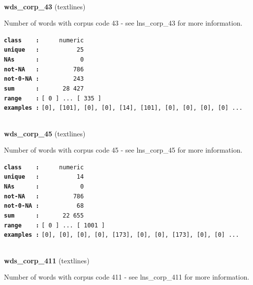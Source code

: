 \documentclass[]{article}
\begin{document}
~

\textbf{wds\_corp\_43} (textlines)

Number of words with corpus code 43 - see lns\_corp\_43 for more
information.

\textbf{\texttt{class\ \ \ \ :}} \texttt{~~~~~numeric}\\
\textbf{\texttt{unique\ \ \ :}} \texttt{~~~~~~~~~~25}\\
\textbf{\texttt{NAs\ \ \ \ \ \ :}} \texttt{~~~~~~~~~~~0}\\
\textbf{\texttt{not-NA\ \ \ :}} \texttt{~~~~~~~~~786}\\
\textbf{\texttt{not-0-NA\ :}} \texttt{~~~~~~~~~243}\\
\textbf{\texttt{sum\ \ \ \ \ \ :}} \texttt{~~~~~~28~427}\\
\textbf{\texttt{range\ \ \ \ :}}
\texttt{{[}\ 0\ {]}\ ...\ {[}\ 335\ {]}}\\
\textbf{\texttt{examples\ :}}
\texttt{{[}0{]},\ {[}101{]},\ {[}0{]},\ {[}0{]},\ {[}14{]},\ {[}101{]},\ {[}0{]},\ {[}0{]},\ {[}0{]},\ {[}0{]}\ ...}\\

~

\textbf{wds\_corp\_45} (textlines)

Number of words with corpus code 45 - see lns\_corp\_45 for more
information.

\textbf{\texttt{class\ \ \ \ :}} \texttt{~~~~~numeric}\\
\textbf{\texttt{unique\ \ \ :}} \texttt{~~~~~~~~~~14}\\
\textbf{\texttt{NAs\ \ \ \ \ \ :}} \texttt{~~~~~~~~~~~0}\\
\textbf{\texttt{not-NA\ \ \ :}} \texttt{~~~~~~~~~786}\\
\textbf{\texttt{not-0-NA\ :}} \texttt{~~~~~~~~~~68}\\
\textbf{\texttt{sum\ \ \ \ \ \ :}} \texttt{~~~~~~22~655}\\
\textbf{\texttt{range\ \ \ \ :}}
\texttt{{[}\ 0\ {]}\ ...\ {[}\ 1001\ {]}}\\
\textbf{\texttt{examples\ :}}
\texttt{{[}0{]},\ {[}0{]},\ {[}0{]},\ {[}0{]},\ {[}173{]},\ {[}0{]},\ {[}0{]},\ {[}173{]},\ {[}0{]},\ {[}0{]}\ ...}\\

~

\textbf{wds\_corp\_411} (textlines)

Number of words with corpus code 411 - see lns\_corp\_411 for more
information.
\end{document}
